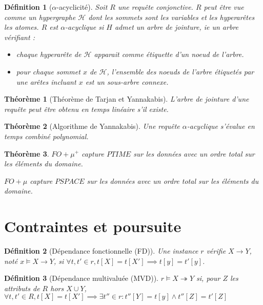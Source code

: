\documentclass[landscape]{article}
\renewcommand{\H}{\mathscr{H}}
\newcommand{\1}{\mathbbm{1}}
\newtheorem{theo}{Théorème}
\newtheorem{defi}{Définition}
\begin{document}
\begin{multicols}{2}
    \begin{defi}[$\alpha$-acyclicité]
        Soit $R$ une requête conjonctive. $R$ peut être vue comme un hypergraphe $\H$
        dont les sommets sont les variables et les hyperarêtes les atomes. $R$ est
        $\alpha$-acyclique si $H$ admet un arbre de jointure, ie un arbre vérifiant :
        \begin{itemize}
            \item chaque hyperarête de $\H$ apparait comme étiquette d'un noeud de l'arbre.
            \item pour chaque sommet $x$ de $\H$, l'ensemble des noeuds de l'arbre étiquetés
                par une arêtes incluant $x$ est un sous-arbre connexe.
        \end{itemize}
    \end{defi}

    \begin{theo}[Théorème de Tarjan et Yannakabis]
        L'arbre de jointure d'une requête peut être obtenu en temps linéaire
        s'il existe.
    \end{theo}

    \begin{theo}[Algorithme de Yannakabis]
        Une requête $\alpha$-acyclique s'évalue en temps combiné polynomial.
    \end{theo}

    \begin{theo} $FO+\mu^+$ capture $PTIME$ sur les données avec un ordre total sur
        les éléments du domaine.
        
        $FO+\mu$ capture $PSPACE$ sur les données avec un ordre total sur les éléments
        du domaine.
    \end{theo}

    \section{Contraintes et poursuite}

    \begin{defi}[Dépendance fonctionnelle (FD)]
        Une instance $r$ vérifie $X\rightarrow Y$, noté $x\models X\rightarrow Y$,
        si $\forall t, t'\in r, t[X] = t[X']\implies t[y] = t'[y]$.
    \end{defi}

    \begin{defi}[Dépendance multivaluée (MVD)]
        $r\models X\twoheadrightarrow Y$ si, pour $Z$ les attributs de $R$ hors
        $X\cup Y$, $\forall t, t'\in R, t[X] = t[X'] \implies \exists t''\in r:
        t''[Y] = t[y] \wedge t''[Z] = t'[Z]$
    \end{defi}


\end{multicols}
\end{document}

